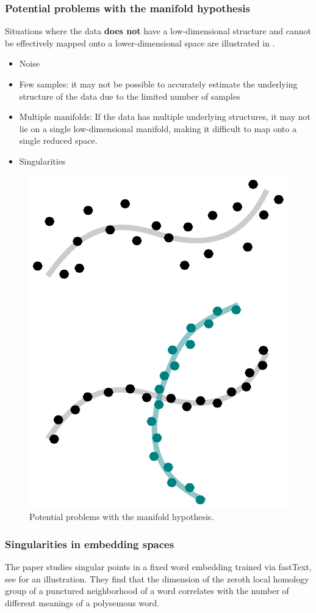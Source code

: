 \documentclass[11pt, a4paper]{amsart}
\begin{document}
\subsubsection{Potential problems with the manifold hypothesis}

Situations where the data \textbf{does not} have a low-dimensional structure and cannot be effectively mapped onto a lower-dimensional space are illustrated in .

\begin{itemize}
	\item Noise
	\item Few samples:
	it may not be possible to accurately estimate the underlying structure of the data due to the limited number of samples
	\item Multiple manifolds:
	If the data has multiple underlying structures, it may not lie on a single low-dimensional manifold, making it difficult to map onto a single reduced space.
	\item Singularities
\end{itemize}

\begin{figure}
	\centering
	\includegraphics[width=0.35\linewidth]{figures/topological_data_analysis/manifold_hypothesis_problems.pdf}
	\caption{
		Potential problems with the manifold hypothesis.
		\label{fig:manifold_hypothesis_problems}
	}
\end{figure}

\subsubsection{Singularities in embedding spaces}

The paper \cite{jakubowski2020topology} studies singular points in a fixed word embedding trained via fastText, see  for an illustration.
They find that the dimension of the zeroth local homology group of a punctured neighborhood of a word correlates with the number of different meanings of a polysemous word.
\end{document}
